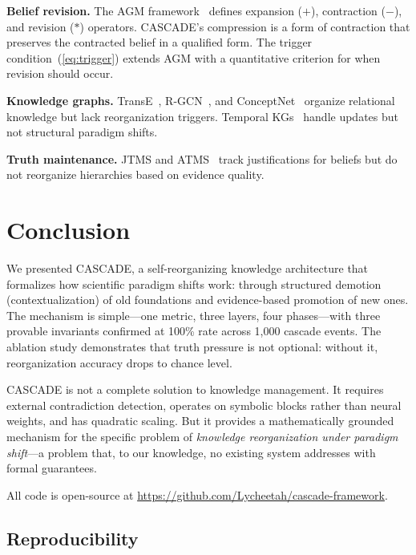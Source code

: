 \documentclass[11pt,a4paper]{article}
\theoremstyle{definition}
\begin{document}
\textbf{Belief revision.} The AGM framework~\citep{alchourron1985logic} defines expansion ($+$), contraction ($-$), and revision ($*$) operators. CASCADE's compression is a form of contraction that preserves the contracted belief in a qualified form. The trigger condition~(\ref{eq:trigger}) extends AGM with a quantitative criterion for when revision should occur.

\textbf{Knowledge graphs.} TransE~\citep{bordes2013translating}, R-GCN~\citep{schlichtkrull2018modeling}, and ConceptNet~\citep{speer2017conceptnet} organize relational knowledge but lack reorganization triggers. Temporal KGs~\citep{trivedi2017know} handle updates but not structural paradigm shifts.

\textbf{Truth maintenance.} JTMS and ATMS~\citep{doyle1979truth,dekleer1986assumption} track justifications for beliefs but do not reorganize hierarchies based on evidence quality.

\section{Conclusion}\label{sec:conclusion}

We presented CASCADE, a self-reorganizing knowledge architecture that formalizes how scientific paradigm shifts work: through structured demotion (contextualization) of old foundations and evidence-based promotion of new ones. The mechanism is simple---one metric, three layers, four phases---with three provable invariants confirmed at 100\% rate across 1{,}000 cascade events. The ablation study demonstrates that truth pressure is not optional: without it, reorganization accuracy drops to chance level.

CASCADE is not a complete solution to knowledge management. It requires external contradiction detection, operates on symbolic blocks rather than neural weights, and has quadratic scaling. But it provides a mathematically grounded mechanism for the specific problem of \emph{knowledge reorganization under paradigm shift}---a problem that, to our knowledge, no existing system addresses with formal guarantees.

All code is open-source at \url{https://github.com/Lycheetah/cascade-framework}.

\subsection*{Reproducibility}
\end{document}
